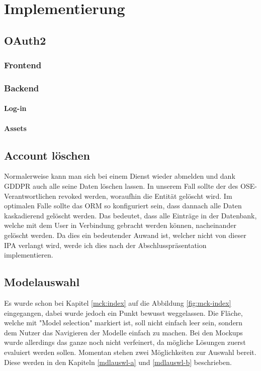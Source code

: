 
\chapter{Implementierung}
\section{OAuth2}
\subsection{Frontend}
\subsection{Backend}
\subsubsection{Log-in}
\subsubsection{Assets}
\section{Account löschen}
Normalerweise kann man sich bei einem Dienst wieder abmelden und dank GDDPR auch alle seine Daten löschen lassen. In unserem Fall sollte der  des OSE-Verantwortlichen revoked werden, woraufhin die Entität gelöscht wird. Im optimalen Falle sollte das ORM so konfiguriert sein, dass dannach alle Daten kaskadierend gelöscht werden. Das bedeutet, dass alle Einträge in der Datenbank, welche mit dem User in Verbindung gebracht werden können, nacheinander gelöscht werden.
\newline
Da dies ein bedeutender Auwand ist, welcher nicht von dieser IPA verlangt wird, werde ich dies nach der Abschlusspräsentation implementieren.
\section{Modelauswahl}
Es wurde schon bei Kapitel \ref{mck:index} auf die Abbildung \ref{fig:mck-index} eingegangen, dabei wurde jedoch ein Punkt bewusst weggelassen. Die Fläche, welche mit "Model selection" markiert ist, soll nicht einfach leer sein, sondern dem Nutzer das Navigieren der Modelle einfach zu machen.
\newline
Bei den Mockups wurde allerdings das ganze noch nicht verfeinert, da mögliche Lösungen zuerst evaluiert werden sollen. Momentan stehen zwei Möglichkeiten zur Auswahl bereit. Diese werden in den Kapiteln \ref{mdlauswl-a} und \ref{mdlauswl-b} beschrieben.
